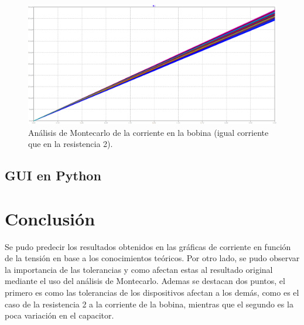 \documentclass[a4paper]{article}
\begin{document}
\begin{figure}[H]
	\centering
	\includegraphics[width=\textwidth]{LTSpice-MC1-IL}
	\caption{Análisis de Montecarlo de la corriente en la bobina (igual corriente que en la resistencia 2).}
	\label{fig:LTSMCIL}
\end{figure}

\subsection*{GUI en Python}

\section*{Conclusión}

Se pudo predecir los resultados obtenidos en las gráficas de corriente en función de la tensión en base a los conocimientos teóricos. Por otro lado, se pudo observar la importancia de las tolerancias y como afectan estas al resultado original mediante el uso del análisis de Montecarlo. Ademas se destacan dos puntos, el primero es como las tolerancias de los dispositivos afectan a los demás, como es el caso de la resistencia 2 a la corriente de la bobina, mientras que el segundo es la poca variación en el capacitor. 
\end{document}
